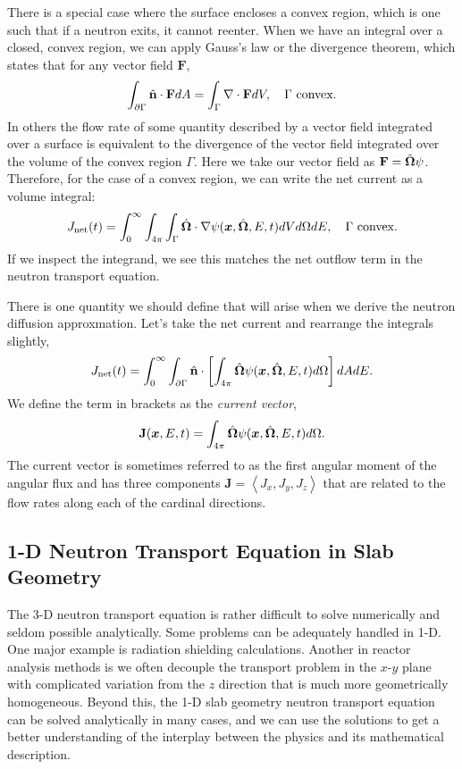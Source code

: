 There is a special case where the surface encloses a convex region, which is one such that if a neutron exits, it cannot reenter. When we have an integral over a closed, convex region, we can apply Gauss's law or the divergence theorem, which states that for any vector field $\mathbf{F}$,
\begin{align}
  \int_{\partial \Gamma} \hat{\mathbf{n}} \cdot \mathbf{F} dA = \int_\Gamma \nabla \cdot \mathbf{F} dV, \quad \text{$\Gamma$ convex.}
\end{align}
In others the flow rate of some quantity described by a vector field integrated over a surface is equivalent to the divergence of the vector field integrated over the volume of the convex region $\Gamma$. Here we take our vector field as $\mathbf{F} = \hat{\mathbf{\Omega}} \psi$. Therefore, for the case of a convex region, we can write the net current as a volume integral:
\begin{align}
  J_\textrm{net}(t) = \int_0^\infty \int_{4\pi} \int_{\Gamma} \hat{\mathbf{\Omega}} \cdot \nabla \psi (\bm{x},\hat{\mathbf{\Omega}},E,t) dV d\Omega dE , \quad \text{$\Gamma$ convex.}
\end{align}
If we inspect the integrand, we see this matches the net outflow term in the neutron transport equation.

There is one quantity we should define that will arise when we derive the neutron diffusion approxmation. Let's take the net current and rearrange the integrals slightly,
\begin{align}
  J_\textrm{net}(t) = \int_0^\infty  \int_{\partial \Gamma} \hat{\mathbf{n}} \cdot  \left[ \int_{4\pi} \hat{\mathbf{\Omega}} \psi (\bm{x},\hat{\mathbf{\Omega}},E,t) d\Omega \right] dA  dE .
\end{align}
We define the term in brackets as the \emph{current vector},
\begin{align}
  \mathbf{J}(\bm{x},E,t) = \int_{4\pi} \hat{\mathbf{\Omega}} \psi (\bm{x},\hat{\mathbf{\Omega}},E,t) d\Omega .
\end{align}
The current vector is sometimes referred to as the first angular moment of the angular flux and has three components $\mathbf{J} = \left< J_x, J_y, J_z \right>$ that are related to the flow rates along each of the cardinal directions. 

\subsection{1-D Neutron Transport Equation in Slab Geometry}

The 3-D neutron transport equation is rather difficult to solve numerically and seldom possible analytically. Some problems can be adequately handled in 1-D. One major example is radiation shielding calculations. Another in reactor analysis methods is we often decouple the transport problem in the $x$-$y$ plane with complicated variation from the $z$ direction that is much more geometrically homogeneous. Beyond this, the 1-D slab geometry neutron transport equation can be solved analytically in many cases, and we can use the solutions to get a better understanding of the interplay between the physics and its mathematical description.

